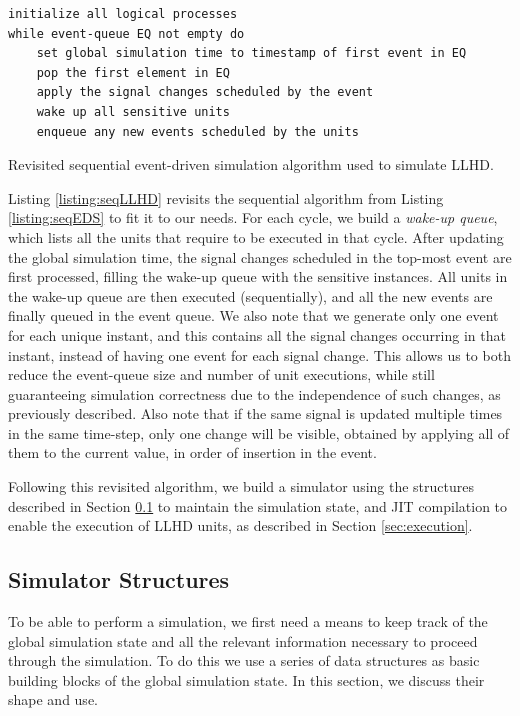 \begin{listing}[ht]
    \begin{verbatim}
initialize all logical processes
while event-queue EQ not empty do
    set global simulation time to timestamp of first event in EQ
    pop the first element in EQ
    apply the signal changes scheduled by the event
    wake up all sensitive units
    enqueue any new events scheduled by the units
    \end{verbatim}
    \caption{Revisited sequential event-driven simulation algorithm used to simulate LLHD.}
    \label{listing:seqLLHD}
\end{listing}

Listing \ref{listing:seqLLHD} revisits the sequential algorithm from Listing \ref{listing:seqEDS} to fit it to our needs. For each cycle, we build a \textit{wake-up queue}, which lists all the units that require to be executed in that cycle. After updating the global simulation time, the signal changes scheduled in the top-most event are first processed, filling the wake-up queue with the sensitive instances. All units in the wake-up queue are then executed (sequentially), and all the new events are finally queued in the event queue. We also note that we generate only one event for each unique instant, and this contains all the signal changes occurring in that instant, instead of having one event for each signal change. This allows us to both reduce the event-queue size and number of unit executions, while still guaranteeing simulation correctness due to the independence of such changes, as previously described. Also note that if the same signal is updated multiple times in the same time-step, only one change will be visible, obtained by applying all of them to the current value, in order of insertion in the event.


Following this revisited algorithm, we build a simulator using the structures described in Section \ref{sec:structs} to maintain the simulation state, and JIT compilation to enable the execution of LLHD units, as described in Section \ref{sec:execution}.


\subsection{Simulator Structures}
\label{sec:structs}
To be able to perform a simulation, we first need a means to keep track of the global simulation state and all the relevant information necessary to proceed through the simulation. To do this we use a series of data structures as basic building blocks of the global simulation state. In this section, we discuss their shape and use.

